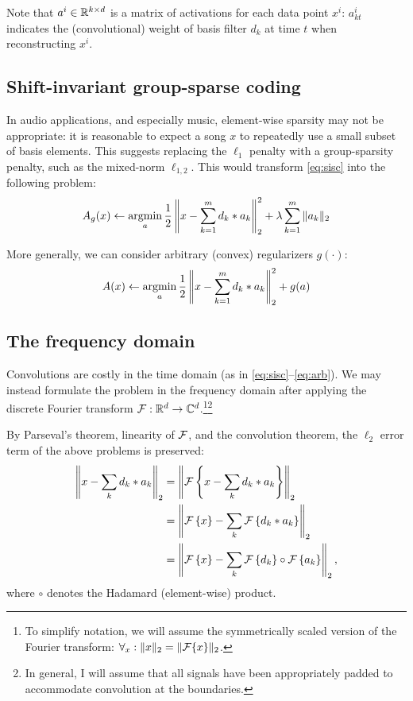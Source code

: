 \documentclass{article}
\renewcommand{\C}{\ensuremath{\mathbb{C}}}
\begin{document}
Note that $a^i \in \mathbb{R}^{k \times d}$ is a matrix of activations for each data point $x^i$: $a^i_{kt}$ indicates the (convolutional) weight of basis filter $d_k$ at time $t$ when reconstructing $x^i$.

\subsection{Shift-invariant group-sparse coding}
In audio applications, and especially music, element-wise sparsity may not be appropriate: it is reasonable to expect a song $x$ to repeatedly use a small subset of basis elements.  This
suggests replacing the $\ell_1$ penalty with a group-sparsity penalty, such as the mixed-norm $\ell_{1,2}$.  This would transform \autoref{eq:sisc} into the following problem:
\begin{align}
A_g(x) \leftarrow \operatorname*{argmin}_a \frac{1}{2} \left\|x - \sum_{k=1}^m d_k * a_k \right\|_2^2 + \lambda
\sum_{k=1}^m \|a_k\|_2 \label{eq:sigsc}
\end{align}

More generally, we can consider arbitrary (convex) regularizers $g(\cdot)$:
\begin{align}
A(x) \leftarrow \operatorname*{argmin}_a \frac{1}{2} \left\|x - \sum_{k=1}^m d_k * a_k \right\|_2^2 + g(a) \label{eq:arb}
\end{align}

\subsection{The frequency domain}
Convolutions are costly in the time domain (as in \autoref{eq:sisc}--\autoref{eq:arb}).  
We may instead formulate the problem in the frequency domain after applying the 
discrete Fourier transform $\FT:\R^d\rightarrow\C^d$.\footnote{To simplify notation, we will assume the symmetrically scaled version of the Fourier transform: $\forall_x: \|x\|_2 =
\|\mathcal{F}\{x\}\|_2$.}\footnote{In general, I will assume that all signals have been appropriately padded to accommodate
convolution at the boundaries.}

By Parseval's theorem, linearity of $\mathcal{F}$, and the convolution theorem, the $\ell_2$ error term of the above problems is preserved:
\begin{align*}
\left\|x - \sum_k d_k * a_k\right\|_2 &= \left\|\mathcal{F}\left\{x - \sum_k d_k * a_k\right\}\right\|_2\\
                                    &= \left\|\mathcal{F}\left\{x\right\} - \sum_k \mathcal{F}\left\{d_k * a_k\right\}\right\|_2\\
                                    &= \left\|\mathcal{F}\left\{x\right\} - \sum_k \mathcal{F}\left\{d_k\right\} \circ \mathcal{F}\left\{a_k\right\}\right\|_2,
\end{align*}
where $\circ$ denotes the Hadamard (element-wise) product.
\end{document}
